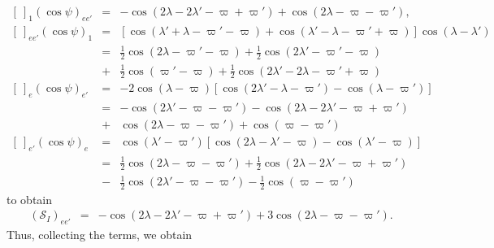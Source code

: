 \documentclass [12pt, a4paper] {article}
\begin{document}
\begin {eqnarray}
    \left[\:\right]_1\left(\cos\psi\right)_{ee'}
    &=&
    -
    \cos(2\lambda - 2\lambda' - \varpi + \varpi')
    +
    \cos(2\lambda - \varpi - \varpi'),
    \\
    \left[\:\right]_{ee'}\left(\cos\psi\right)_{1}
    &=&
    \left[
        \cos(\lambda' + \lambda - \varpi' - \varpi) 
        + 
        \cos(\lambda' - \lambda - \varpi' + \varpi)
    \right]
    \cos(\lambda - \lambda')
    \\
    &=&
    \frac{1}{2}\cos(2\lambda - \varpi' - \varpi)
    +
    \frac{1}{2}\cos(2\lambda' - \varpi' - \varpi)
    \\\nonumber
    &+&
    \frac{1}{2}\cos(\varpi' - \varpi)
    +
    \frac{1}{2}\cos(2\lambda' - 2\lambda  - \varpi' + \varpi)
    \\
    \left[\:\right]_{e}\left(\cos\psi\right)_{e'} 
    &=&
    -2\cos(\lambda - \varpi)
    \left[
        \cos(2\lambda' - \lambda - \varpi') - \cos(\lambda - \varpi')        
    \right]
    \\
    &=&
    -\cos(2\lambda' - \varpi - \varpi')
    -\cos(2\lambda - 2\lambda' - \varpi + \varpi')
    \\\nonumber
    &+&
    \cos(2\lambda - \varpi - \varpi')
    +\cos(\varpi - \varpi')
    \\
    \left[\:\right]_{e'}\left(\cos\psi\right)_{e} 
    &=&
    \cos(\lambda' - \varpi')
    \left[
        \cos(2\lambda - \lambda' - \varpi) - \cos(\lambda' - \varpi)        
    \right]
    \\
    &=&
    \frac{1}{2}\cos(2\lambda - \varpi - \varpi')
    +
    \frac{1}{2}\cos(2\lambda - 2\lambda' - \varpi + \varpi')
    \\\nonumber 
    &-&
    \frac{1}{2}\cos(2\lambda' - \varpi - \varpi')
    -
    \frac{1}{2}\cos(\varpi - \varpi')
\end {eqnarray}
to obtain 
\begin {eqnarray}
    \left(
        \mathcal{S}_I
    \right)_{ee'}
    &=&
    -\cos(2\lambda - 2\lambda' - \varpi + \varpi')
    +3\cos(2\lambda - \varpi - \varpi').
\end {eqnarray}
Thus, collecting the terms, we obtain 
\end{document}
